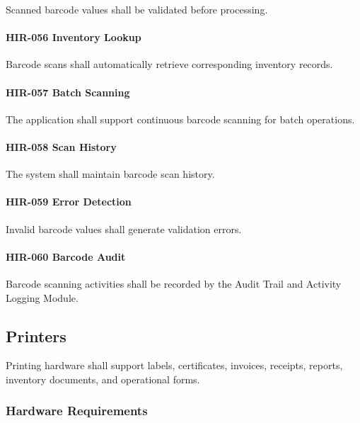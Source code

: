 Scanned barcode values shall be validated before processing.

\paragraph{HIR-056 Inventory Lookup}

Barcode scans shall automatically retrieve corresponding inventory
records.

\paragraph{HIR-057 Batch Scanning}

The application shall support continuous barcode scanning for batch
operations.

\paragraph{HIR-058 Scan History}

The system shall maintain barcode scan history.

\paragraph{HIR-059 Error Detection}

Invalid barcode values shall generate validation errors.

\paragraph{HIR-060 Barcode Audit}

Barcode scanning activities shall be recorded by the Audit Trail and
Activity Logging Module.


\subsection{Printers}

Printing hardware shall support labels, certificates, invoices,
receipts, reports, inventory documents, and operational forms.


\subsubsection*{Hardware Requirements}

